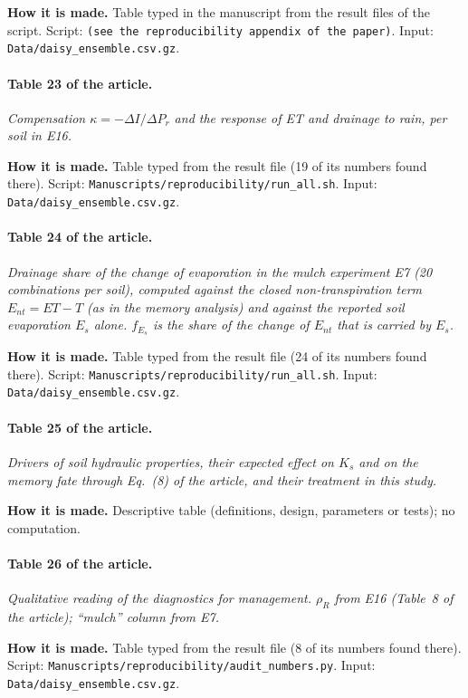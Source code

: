 \textbf{How it is made.} Table typed in the manuscript from the result files of the script. Script: \nolinkurl{(see the reproducibility appendix of the paper)}. Input: \nolinkurl{Data/daisy_ensemble.csv.gz}.

\paragraph{Table 23 of the article.} \emph{Compensation $\kappa=-\Delta I/\Delta P_r$ and the response of ET and drainage to rain, per soil in E16.}

\textbf{How it is made.} Table typed from the result file (19 of its numbers found there). Script: \nolinkurl{Manuscripts/reproducibility/run_all.sh}. Input: \nolinkurl{Data/daisy_ensemble.csv.gz}.

\paragraph{Table 24 of the article.} \emph{Drainage share of the change of evaporation in the mulch experiment E7 (20 combinations per soil), computed against the closed non-transpiration term $E_{nt}=\mathit{ET}-T$ (as in the memory analysis) and against the reported soil evaporation $E_s$ alone. $f_{E_s}$ is the share of the change of $E_{nt}$ that is carried by $E_s$.}

\textbf{How it is made.} Table typed from the result file (24 of its numbers found there). Script: \nolinkurl{Manuscripts/reproducibility/run_all.sh}. Input: \nolinkurl{Data/daisy_ensemble.csv.gz}.

\paragraph{Table 25 of the article.} \emph{Drivers of soil hydraulic properties, their expected effect on $K_s$ and on the memory fate through Eq.~(8) of the article, and their treatment in this study.}

\textbf{How it is made.} Descriptive table (definitions, design, parameters or tests); no computation.

\paragraph{Table 26 of the article.} \emph{Qualitative reading of the diagnostics for management. $\rho_R$ from E16 (Table~8 of the article); ``mulch'' column from E7.}

\textbf{How it is made.} Table typed from the result file (8 of its numbers found there). Script: \nolinkurl{Manuscripts/reproducibility/audit_numbers.py}. Input: \nolinkurl{Data/daisy_ensemble.csv.gz}.


